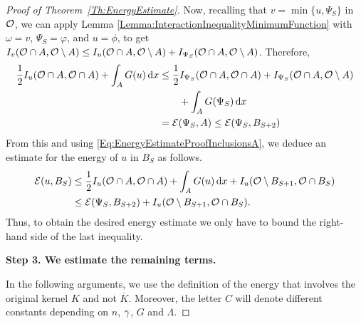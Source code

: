 \begin{proof}[Proof of Theorem~\ref{Th:EnergyEstimate}]
Now, recalling that $v = \min\{u,\Psi_S\}$ in $\mathcal{O}$, we can apply Lemma \ref{Lemma:InteractionInequalityMinimumFunction} with $\omega = v$, $\Psi_S = \varphi$, and $u= \phi$, to get $I_v(\mathcal{O} \cap A, \mathcal{O}\setminus A) \leq I_u(\mathcal{O} \cap A, \mathcal{O}\setminus A) + I_{\Psi_S}(\mathcal{O} \cap A, \mathcal{O}\setminus A)$. Therefore,
\begin{align*}
\frac{1}{2}I_u(\mathcal{O} \cap A, \mathcal{O} \cap A) + \int_{A} G(u) \,\mathrm{d} x &\leq \frac{1}{2}I_{\Psi_S}(\mathcal{O} \cap A, \mathcal{O} \cap A) + I_{\Psi_S}(\mathcal{O} \cap A, \mathcal{O} \setminus A) \\
& \quad \quad  + \int_A G(\Psi_S)  \,\mathrm{d} x \\
&= \mathcal{E}(\Psi_S, A) \leq \mathcal{E}(\Psi_S,B_{S+2})
\end{align*}
From this and using \eqref{Eq:EnergyEstimateProofInclusionsA}, we deduce an estimate for the energy of $u$ in $B_S$ as follows.
\begin{align*}
\mathcal{E}(u,B_S) &\leq \frac{1}{2}I_u(\mathcal{O} \cap A, \mathcal{O} \cap A) + \int_{A} G(u) \,\mathrm{d} x + I_u(\mathcal{O} \setminus B_{S+1}, \mathcal{O} \cap B_S) \\
& \leq  \mathcal{E}(\Psi_S,B_{S+2}) + I_u(\mathcal{O} \setminus B_{S+1}, \mathcal{O} \cap B_S).
\end{align*}
Thus, to obtain the desired energy estimate we only have to bound the right-hand side of the last inequality.


\textbf{Step 3. We estimate the remaining terms.}

In the following arguments, we use the definition of the energy that involves the original kernel $K$ and not $\overline{K}$. Moreover, the letter $C$ will denote different constants depending on $n$, $\gamma$, $G$ and $\Lambda$.


\end{proof}
